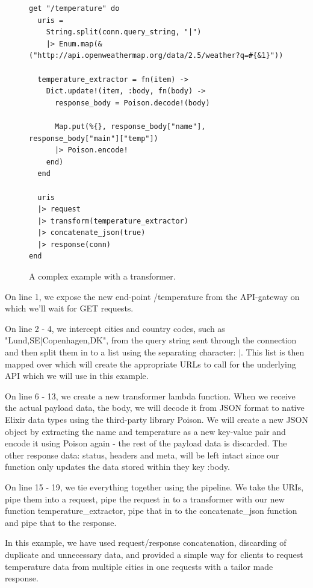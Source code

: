 \documentclass{cslthse-msc}
\begin{document}
\begin{figure}[H]
  \centering
\begin{lstlisting}[breaklines=true,frame=single]
get "/temperature" do
  uris =
    String.split(conn.query_string, "|")
    |> Enum.map(&("http://api.openweathermap.org/data/2.5/weather?q=#{&1}"))

  temperature_extractor = fn(item) ->
    Dict.update!(item, :body, fn(body) ->
      response_body = Poison.decode!(body)

      Map.put(%{}, response_body["name"], response_body["main"]["temp"])
      |> Poison.encode!
    end)
  end

  uris
  |> request
  |> transform(temperature_extractor)
  |> concatenate_json(true)
  |> response(conn)
end
\end{lstlisting}
  \caption{A complex example with a transformer.}
\end{figure}

On line 1, we expose the new end-point /temperature from the API-gateway on which we'll wait for GET requests.

On line 2 - 4, we intercept cities and country codes, such as "Lund,SE|Copenhagen,DK", from the query string sent through the connection and then split them in to a list using the separating character: $|$. This list is then mapped over which will create the appropriate URLs to call for the underlying API which we will use in this example.

On line 6 - 13, we create a new transformer lambda function. When we receive the actual payload data, the body, we will decode it from JSON format to native Elixir data types using the third-party library Poison\cite{poison}. We will create a new JSON object by extracting the name and temperature as a new key-value pair and encode it using Poison again - the rest of the payload data is discarded. The other response data: status, headers and meta, will be left intact since our function only updates the data stored within they key :body.

On line 15 - 19, we tie everything together using the pipeline. We take the URIs, pipe them into a request, pipe the request in to a transformer with our new function temperature\_extractor, pipe that in to the concatenate\_json function and pipe that to the response.

In this example, we have used request/response concatenation, discarding of duplicate and unnecessary data, and provided a simple way for clients to request temperature data from multiple cities in one requests with a tailor made response.
\end{document}
